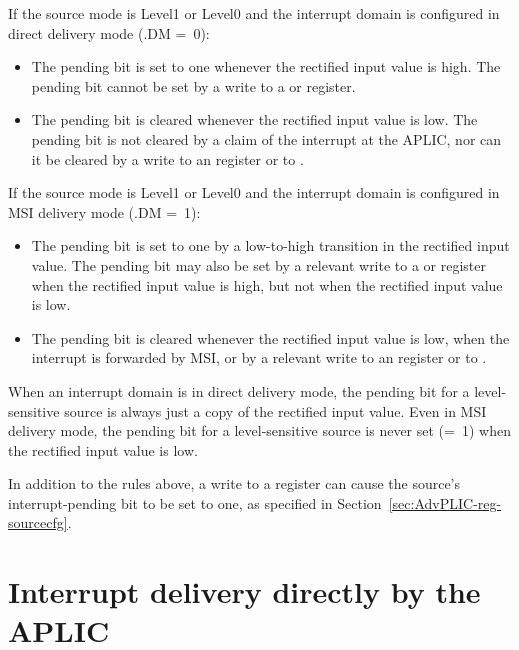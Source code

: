 If the source mode is Level1 or Level0 and the interrupt domain is
configured in direct delivery mode (.DM =~0):
\begin{itemize}

\item
The pending bit is set to one whenever the rectified input value is
high.
The pending bit cannot be set by a write to a  or 
register.

\item
The pending bit is cleared whenever the rectified input value is low.
The pending bit is not cleared by a claim of the interrupt at the APLIC,
nor can it be cleared by a write to an  register or to
.

\end{itemize}

If the source mode is Level1 or Level0 and the interrupt domain is
configured in MSI delivery mode (.DM =~1):
\begin{itemize}

\item
The pending bit is set to one by a low-to-high transition in the
rectified input value.
The pending bit may also be set by a relevant write to a  or
 register when the rectified input value is high, but not
when the rectified input value is low.

\item
The pending bit is cleared whenever the rectified input value is low,
when the interrupt is forwarded by MSI, or by a relevant write
to an  register or to .

\end{itemize}

\begin{commentary}
When an interrupt domain is in direct delivery mode, the pending bit
for a level-sensitive source is always just a copy of the rectified
input value.
Even in MSI delivery mode, the pending bit for a level-sensitive source
is never set (=~1) when the rectified input value is low.
\end{commentary}

In addition to the rules above, a write to a  register can
cause the source's interrupt-pending bit to be set to one, as specified
in Section~\ref{sec:AdvPLIC-reg-sourcecfg}.

\section{Interrupt delivery directly by the APLIC}
\label{sec:AdvPLIC-directMode}

